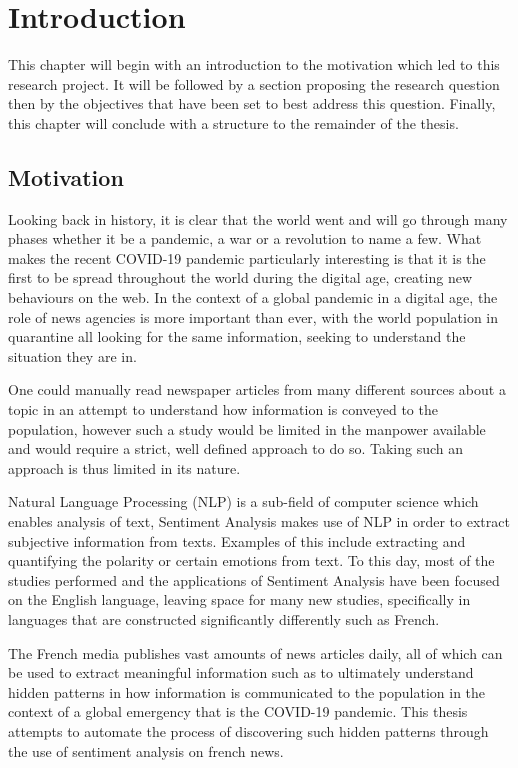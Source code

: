 \chapter{Introduction}\label{Introduction}

This chapter will begin with an introduction to the motivation which led to this research project. It will be followed by a section proposing the research question then by the objectives that have been set to best address this question. Finally, this chapter will conclude with a structure to the remainder of the thesis.

\section{Motivation}\label{Motivation}
Looking back in history, it is clear that the world went and will go through many phases
whether it be a pandemic, a war or a revolution to name a few. What makes the recent COVID-19 pandemic particularly interesting is that it is the first to be spread throughout the world during the digital age, creating new behaviours on the web.   
In the context of a global pandemic in a digital age, the role of news agencies is more important than ever, with the world population in quarantine all looking for the same information, seeking to understand the situation they are in.

One could manually read newspaper articles from many different sources about a topic in an attempt to understand how information is conveyed to the population, however such a study would be limited in the manpower available and would require a strict, well defined approach to do so. Taking such an approach is thus limited in its nature.

Natural Language Processing (NLP) is a sub-field of computer science which enables analysis of text, Sentiment Analysis makes use of NLP in order to extract subjective information from texts. Examples of this include extracting and quantifying the polarity or certain emotions from text.
To this day, most of the studies performed and the applications of Sentiment Analysis have been focused on the English language, leaving space for many new studies, specifically in languages that are constructed significantly differently such as French.

The French media publishes vast amounts of news articles daily, all of which can be used to extract meaningful information such as to ultimately understand hidden patterns in how information is communicated to the population in the context of a global emergency that is the COVID-19 pandemic.
This thesis attempts to automate the process of discovering such hidden patterns through the use of sentiment analysis on french news.

